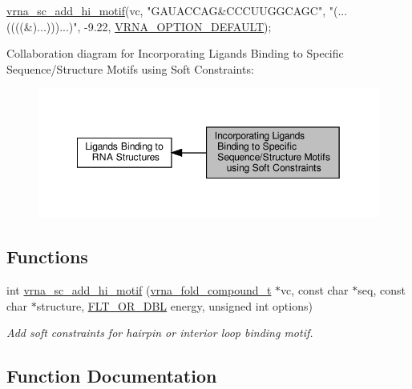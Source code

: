 \begin{DoxyCode}
\hyperlink{group__constraints__ligand_gaa6ff0113a3a76dc0b8d62961f4e1dfa0}{vrna\_sc\_add\_hi\_motif}(vc,
                   \textcolor{stringliteral}{"GAUACCAG&CCCUUGGCAGC"},
                   \textcolor{stringliteral}{"(...((((&)...)))...)"},
                   -9.22, \hyperlink{group__fold__compound_gacea5b7ee6181c485f36e2afa0e9089e4}{VRNA\_OPTION\_DEFAULT}); 
\end{DoxyCode}
 Collaboration diagram for Incorporating Ligands Binding to Specific Sequence/\+Structure Motifs using Soft Constraints\+:
\nopagebreak
\begin{figure}[H]
\begin{center}
\leavevmode
\includegraphics[width=349pt]{group__constraints__ligand}
\end{center}
\end{figure}
\subsection*{Functions}
\begin{DoxyCompactItemize}
\item 
int \hyperlink{group__constraints__ligand_gaa6ff0113a3a76dc0b8d62961f4e1dfa0}{vrna\+\_\+sc\+\_\+add\+\_\+hi\+\_\+motif} (\hyperlink{group__fold__compound_ga1b0cef17fd40466cef5968eaeeff6166}{vrna\+\_\+fold\+\_\+compound\+\_\+t} $\ast$vc, const char $\ast$seq, const char $\ast$structure, \hyperlink{group__data__structures_ga31125aeace516926bf7f251f759b6126}{F\+L\+T\+\_\+\+O\+R\+\_\+\+D\+BL} energy, unsigned int options)
\begin{DoxyCompactList}\small\item\em Add soft constraints for hairpin or interior loop binding motif. \end{DoxyCompactList}\end{DoxyCompactItemize}


\subsection{Function Documentation}
\mbox{\label{group__constraints__ligand_gaa6ff0113a3a76dc0b8d62961f4e1dfa0}} 
